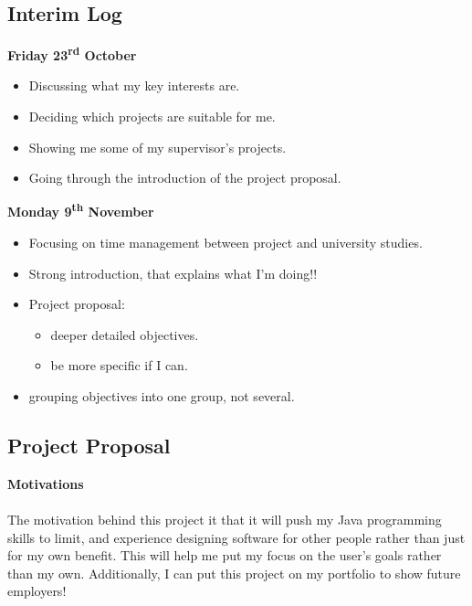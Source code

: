 \documentclass[a4paper, 12pt]{article}
\begin{document}
        \subsection{Interim Log}
            \textbf{Friday 23\textsuperscript{rd} October}
                \begin{itemize}
                    \item Discussing what my key interests are.
                    \item Deciding which projects are suitable for me.
                    \item Showing me some of my supervisor's projects. 
                    \item Going through the introduction of the project proposal. \\
                \end{itemize}
            \textbf{Monday 9\textsuperscript{th} November} 
                \begin{itemize}
                    \item Focusing on time management between project and university
                    studies.
                    \item Strong introduction, that explains what I'm doing!!
                    \item Project proposal:
                    \begin{itemize}
                        \item deeper detailed objectives.
                        \item be more specific if I can.
                    \end{itemize}
                    \item grouping objectives into one group, not several.
                \end{itemize}

        \clearpage
        \subsection{Project Proposal}
            \textbf{Motivations} \\\\    
            The motivation behind this project it that it will push my Java programming
            skills to limit, and experience designing software for other people rather
            than just for my own benefit. This will help me put my focus on the user's
            goals rather than my own. Additionally, I can put this project on my portfolio
            to show future employers!
\end{document}
